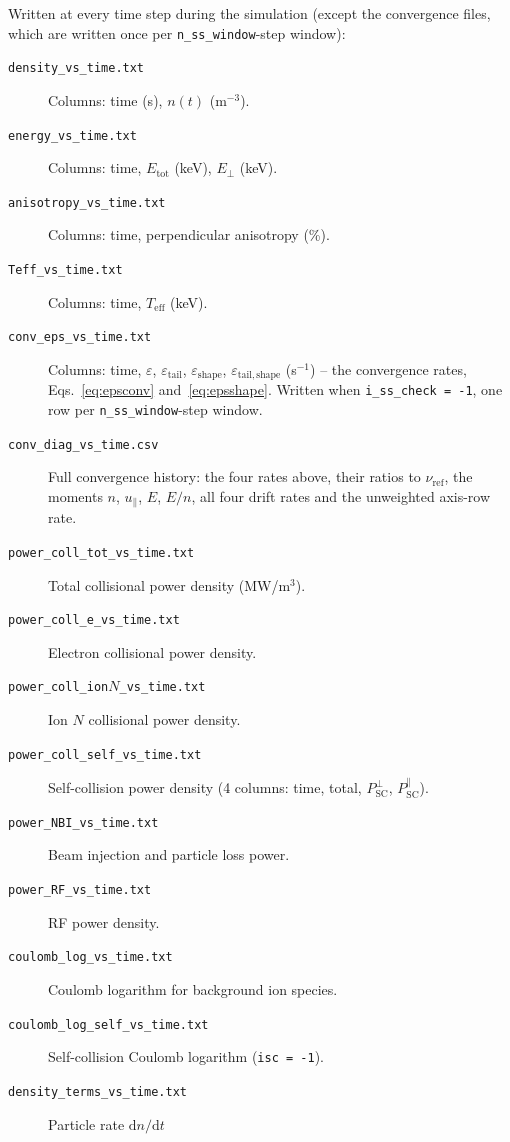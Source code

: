 \documentclass[11pt,a4paper]{article}
\begin{document}
Written at every time step during the simulation (except the convergence files,
which are written once per \texttt{n\_ss\_window}-step window):

\begin{description}
  \item[\texttt{density\_vs\_time.txt}] Columns: time (s), $n(t)$ (m$^{-3}$).
  \item[\texttt{energy\_vs\_time.txt}] Columns: time, $E_\mathrm{tot}$ (keV), $E_\perp$ (keV).
  \item[\texttt{anisotropy\_vs\_time.txt}] Columns: time, perpendicular anisotropy (\%).
  \item[\texttt{Teff\_vs\_time.txt}] Columns: time, $T_\mathrm{eff}$ (keV).
  \item[\texttt{conv\_eps\_vs\_time.txt}] Columns: time, $\varepsilon$,
        $\varepsilon_\mathrm{tail}$, $\varepsilon_\mathrm{shape}$,
        $\varepsilon_\mathrm{tail,shape}$ (s$^{-1}$) -- the convergence rates,
        Eqs.~\eqref{eq:epsconv} and~\eqref{eq:epsshape}.  Written when
        \texttt{i\_ss\_check = -1}, one row per \texttt{n\_ss\_window}-step window.
  \item[\texttt{conv\_diag\_vs\_time.csv}] Full convergence history: the four rates
        above, their ratios to $\nu_\mathrm{ref}$, the moments $n$, $u_\parallel$,
        $E$, $E/n$, all four drift rates and the unweighted axis-row rate.
  \item[\texttt{power\_coll\_tot\_vs\_time.txt}] Total collisional power density (MW/m$^3$).
  \item[\texttt{power\_coll\_e\_vs\_time.txt}] Electron collisional power density.
  \item[\texttt{power\_coll\_ion$N$\_vs\_time.txt}] Ion $N$ collisional power density.
  \item[\texttt{power\_coll\_self\_vs\_time.txt}] Self-collision power density
        (4 columns: time, total, $P_\mathrm{SC}^\perp$, $P_\mathrm{SC}^\parallel$).
  \item[\texttt{power\_NBI\_vs\_time.txt}] Beam injection and particle loss power.
  \item[\texttt{power\_RF\_vs\_time.txt}] RF power density.
  \item[\texttt{coulomb\_log\_vs\_time.txt}] Coulomb logarithm for background ion species.
  \item[\texttt{coulomb\_log\_self\_vs\_time.txt}] Self-collision Coulomb logarithm
        (\texttt{isc = -1}).
  \item[\texttt{density\_terms\_vs\_time.txt}] Particle rate $\mathrm{d}n/\mathrm{d}t$

\end{description}
\end{document}
